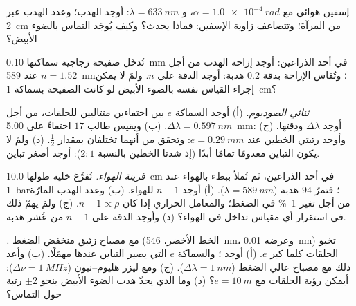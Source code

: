 \begin{exercise}[$\star$]\label{exo:b2:michelson:3}
إسفين هوائي مع $\alpha = \qty{1.0e-4}{rad}$، و $\lambda = \qty{633}{nm}$: أوجد  الهدب؛
وعدد الهدب عبر \qty{2}{cm} من المرآة؛ وتتضاعف زاوية الإسفين:
فماذا يحدث؟ وكيف يُوجَد التماس بالضوء الأبيض؟
\end{exercise}

\begin{exercise}[$\star$]\label{exo:b2:michelson:4}
تُدخَل صفيحة زجاجية سماكتها \qty{0.10}{mm} في أحد الذراعين: أوجد إزاحة الهدب من أجل
$n = 1.52$ عند \qty{589}{nm}؛ وتُقاس الإزاحة بدقة $0.2$ هدبة: أوجد الدقة
على $n$. ولمَ لا يمكن إجراء القياس نفسه بالضوء الأبيض
لو كانت الصفيحة بسماكة \qty{1}{cm}؟
\end{exercise}

\begin{exercise}[$\star\star$]\label{exo:b2:michelson:5}
\emph{ثنائي الصوديوم.} (أ) أوجد السماكة $e$ بين اختفاءين
متتاليين للحلقات، من أجل $\Delta\lambda = \qty{0.597}{nm}$. (ب) ويقيس طالب
$17$ اختفاءً على \qty{5.00}{mm}: أوجد $\Delta\lambda$ ودقتها.
(ج) وأوجد رتبتي الخطين عند $e = \qty{0.29}{mm}$: وتحقق من أنهما تختلفان بمقدار
$\tfrac12$. (د) ولمَ لا يكون التباين معدومًا تمامًا أبدًا (إذ شدتا الخطين
بالنسبة $2 : 1$): أوجد أصغر تباين.
\end{exercise}

\begin{exercise}[$\star\star$]\label{exo:b2:michelson:6}
\emph{قرينة الهواء.} تُفرَّغ خلية طولها \qty{10.0}{cm} في أحد الذراعين، ثم
تُملأ ببطء بالهواء عند \qty{1}{bar}؛ فتمرّ $94$ هدبة ($\lambda = \qty{589}{nm}$).
(أ) أوجد $n - 1$ للهواء. (ب) وعدد الهدب المارّة من أجل تغير \qty{1}{\%} في
الضغط؛ والمعامل الحراري إذا كان $n - 1 \propto \rho$. (ج) ولمَ يهمّ ذلك
في استقرار أي مقياس تداخل في الهواء؟ (د) وأوجد الدقة على
$n - 1$ من عُشر هدبة.
\end{exercise}

\begin{exercise}[$\star\star$]\label{exo:b2:michelson:7}
\emph{.} مع مصباح زئبق منخفض الضغط (الخط الأخضر،
\qty{546}{nm}، وعرضه \qty{0.01}{nm}) تخبو الحلقات كلما كبر $e$. (أ) أوجد ؛ والسماكة $e$ التي يصير التباين عندها مهمَلًا. (ب) وأعد ذلك
مع مصباح عالي الضغط ($\Delta\lambda = \qty{1}{nm}$). (ج) ومع ليزر هليوم--نيون
($\Delta\nu = \qty{1}{MHz}$): أيمكن رؤية الحلقات مع $e = \qty{10}{m}$؟ (د) وما الذي
يحدّ هدب الضوء الأبيض بنحو $\pm2$ رتبة حول التماس؟
\end{exercise}

